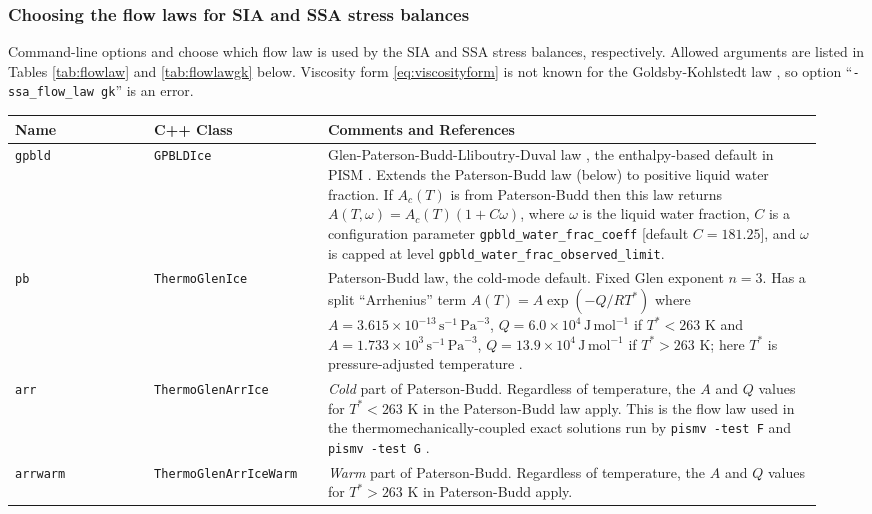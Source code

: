 \subsubsection*{Choosing the flow laws for SIA and SSA stress balances}  Command-line options  and  choose which flow law is used by the SIA and SSA stress balances, respectively.  Allowed arguments are listed in Tables \ref{tab:flowlaw} and \ref{tab:flowlawgk} below.  Viscosity form \eqref{eq:viscosityform} is not known for the Goldsby-Kohlstedt law \cite{GoldsbyKohlstedt}, so option ``\texttt{-ssa_flow_law gk}'' is an error.

\begin{table}[ht]
\centering
{}
\small
\begin{tabular}{p{0.16\linewidth}p{0.2\linewidth}p{0.58\linewidth}}\toprule
\textbf{Name} & C++ Class & \textbf{Comments and References} \\ \midrule
\texttt{gpbld} &\texttt{GPBLDIce}  & Glen-Paterson-Budd-Lliboutry-Duval law \cite{LliboutryDuval1985}, the enthalpy-based default in PISM \cite{AschwandenBuelerKhroulevBlatter}.  Extends the Paterson-Budd law (below) to positive liquid water fraction.  If $A_{c}(T)$ is from Paterson-Budd then this law returns $A(T,\omega) = A_{c}(T) (1 + C \omega)$, where $\omega$ is the liquid water fraction, $C$ is a configuration parameter \texttt{gpbld_water_frac_coeff} [default $C=181.25$], and $\omega$ is capped at level \texttt{gpbld_water_frac_observed_limit}.  \\  \midrule
\texttt{pb} &\texttt{ThermoGlenIce}  & Paterson-Budd law, the cold-mode default.  Fixed Glen exponent $n=3$.  Has a split ``Arrhenius'' term $A(T) = A \exp(-Q/RT^*)$ where \mbox{$A = 3.615 \times 10^{-13}\, \text{s}^{-1}\, \text{Pa}^{-3}$}, \mbox{$Q = 6.0 \times 10^4\, \text{J}\, \text{mol}^{-1}$} if $T^* < 263$ K and
 \mbox{$A = 1.733 \times 10^{3}\, \text{s}^{-1}\, \text{Pa}^{-3}$}, \mbox{$Q = 13.9 \times 10^4\, \text{J}\, \text{mol}^{-1}$} if $T^* > 263$ K; here $T^*$ is pressure-adjusted temperature \cite{PatersonBudd}. \\
\texttt{arr} &  \texttt{ThermoGlenArrIce} & \emph{Cold} part of Paterson-Budd.  Regardless of temperature, the $A$ and $Q$ values for $T^*<263$ K in  the Paterson-Budd law apply.  This is the flow law used in the thermomechanically-coupled exact solutions run by \texttt{pismv -test F} and \texttt{pismv -test G} \cite{BBL,BB}. \\
\texttt{arrwarm} & \texttt{ThermoGlenArrIceWarm} & \emph{Warm} part of Paterson-Budd.  Regardless of temperature, the $A$ and $Q$ values for $T^*>263$ K in Paterson-Budd apply.\\

\end{tabular}
\end{table}
